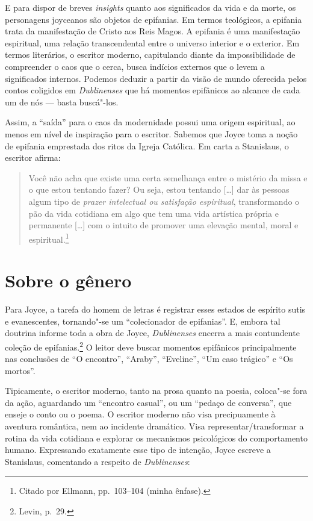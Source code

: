 E para dispor de breves \textit{insights} quanto aos significados da vida e da
morte, os personagens joyceanos são objetos de epifanias. Em termos teológicos,
a epifania trata da manifestação de Cristo aos Reis Magos.  A epifania é uma
manifestação espiritual, uma relação transcendental entre o universo interior e
o exterior. Em termos literários, o escritor moderno, capitulando diante da
impossibilidade de compreender o caos que o cerca, busca indícios externos que
o levem a significados internos. Podemos deduzir a partir da visão de mundo
oferecida pelos contos coligidos em \textit{Dublinenses} que há momentos
epifânicos ao alcance de cada um de nós --- basta buscá"-los.

Assim, a “saída” para o caos da modernidade possui uma origem espiritual, ao
menos em nível de inspiração para o escritor. Sabemos que Joyce toma a noção de
epifania emprestada dos ritos da Igreja Católica. Em carta a Stanislaus, o
escritor afirma: 

\begin{quote}
Você não acha que existe uma certa semelhança entre o mistério da missa e o que
estou tentando fazer? Ou seja, estou tentando [\ldots{}] dar às pessoas algum tipo
de \textit{prazer intelectual ou satisfação espiritual}, transformando o pão da
vida cotidiana em algo que tem uma vida artística própria e permanente [\ldots{}]
com o intuito de promover uma elevação mental, moral e
espiritual.\footnote{ Citado por Ellmann, pp.~103--104 (minha ênfase).}
\end{quote}

\section{Sobre o gênero}

Para Joyce, a tarefa do homem de letras é registrar esses estados de
espírito sutis e evanescentes, tornando"-se um “colecionador de epifanias”. E,
embora tal doutrina informe toda a obra de Joyce, \textit{Dublinenses} encerra a
mais contundente coleção de epifanias.\footnote{ Levin, p.~29.} O leitor deve buscar
momentos epifânicos principalmente nas conclusões de “O encontro”, “Araby”,
“Eveline”, “Um caso trágico” e “Os mortos”.

Tipicamente, o escritor moderno, tanto na prosa quanto na poesia, coloca"-se fora
da ação, aguardando um “encontro casual”, ou um “pedaço de conversa”, que
enseje o conto ou o poema. O escritor moderno não visa precipuamente à aventura
romântica, nem ao incidente dramático. Visa representar/transformar a rotina da
vida cotidiana e explorar os mecanismos psicológicos do comportamento humano.
Expressando exatamente esse tipo de intenção, Joyce escreve a Stanislaus,
comentando a respeito de \textit{Dublinenses}: 

